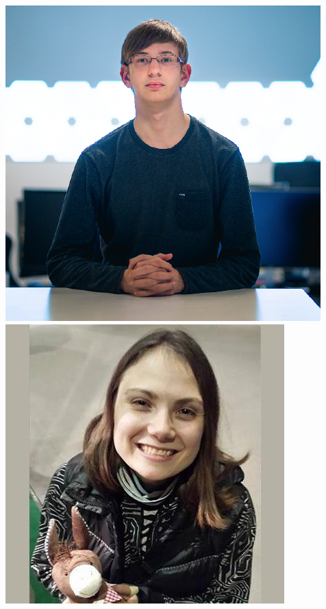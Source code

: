 \documentclass{beamer}
\begin{document}
\begin{frame}
\begin{columns}
\begin{columns}
\includegraphics[width=\textwidth]{Ben.png}
\includegraphics[width=\textwidth]{Irina.jpg}

\end{columns}
\end{columns}
\end{frame}
\end{document}
